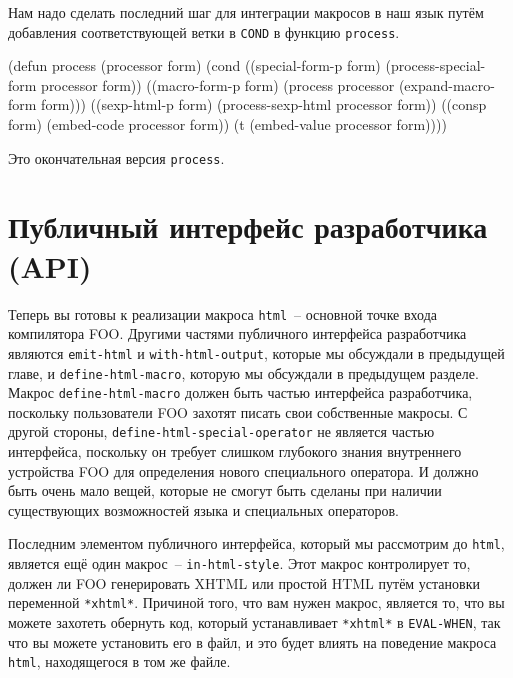 Нам надо сделать последний шаг для интеграции макросов в наш язык путём добавления
соответствующей ветки в \lstinline{COND} в функцию \lstinline{process}.

\begin{myverb}
(defun process (processor form)
  (cond
    ((special-form-p form) (process-special-form processor form))
    ((macro-form-p form)   (process processor (expand-macro-form form)))
    ((sexp-html-p form)    (process-sexp-html processor form))
    ((consp form)          (embed-code processor form))
    (t                     (embed-value processor form))))
\end{myverb}

Это окончательная версия \lstinline{process}.

\section{Публичный интерфейс разработчика (API)}

Теперь вы готовы к реализации макроса \lstinline{html}~-- основной точке входа компилятора
FOO. Другими частями публичного интерфейса разработчика являются \lstinline{emit-html} и
\lstinline{with-html-output}, которые мы обсуждали в предыдущей главе, и
\lstinline{define-html-macro}, которую мы обсуждали в предыдущем разделе. Макрос
\lstinline{define-html-macro} должен быть частью интерфейса разработчика, поскольку
пользователи FOO захотят писать свои собственные макросы. С другой стороны,
\lstinline{define-html-special-operator} не является частью интерфейса, поскольку он требует
слишком глубокого знания внутреннего устройства FOO для определения нового специального
оператора. И должно быть очень мало вещей, которые не смогут быть сделаны при наличии
существующих возможностей языка и специальных операторов.

Последним элементом публичного интерфейса, который мы рассмотрим до \lstinline{html}, является
ещё один макрос~-- \lstinline{in-html-style}.  Этот макрос контролирует то, должен ли FOO
генерировать XHTML или простой HTML путём установки переменной \lstinline{*xhtml*}.  Причиной
того, что вам нужен макрос, является то, что вы можете захотеть обернуть код, который
устанавливает \lstinline{*xhtml*} в \lstinline{EVAL-WHEN}, так что вы можете установить его в файл,
и это будет влиять на поведение макроса \lstinline{html}, находящегося в том же файле.

